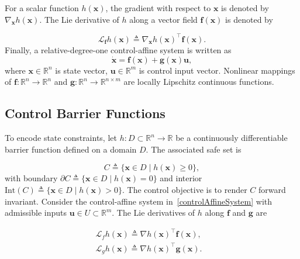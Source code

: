 \documentclass[journal]{IEEEtran}
\begin{document}
For a scalar function $h(\bm{x})$, the gradient with respect to $\bm{x}$ is denoted by $\nabla_{\bm{x}}h(\bm{x})$. The Lie derivative of $h$ along a vector field $\bm{f}(\bm{x})$ is denoted by

\begin{equation}
    \mathcal{L}_{\bm{f}}h(\bm{x})
    \triangleq
    \nabla_{\bm{x}}h(\bm{x})^{\top}\bm{f}(\bm{x}).
\end{equation}
Finally, a relative-degree-one control-affine system is written as
\begin{equation}
\label{controlAffineSystem}
    \dot{\bm{x}} = \bm{f}(\bm{x}) + \bm{g}(\bm{x})\bm{u},
\end{equation}
where $\bm{x} \in \mathbb{R}^n$ is state vector, $\bm{u} \in \mathbb{R}^m$ is control input vector. Nonlinear mappings of $\bm{f} : \mathbb{R}^n \to \mathbb{R}^n$ and $\bm{g} : \mathbb{R}^n \to \mathbb{R}^{n \times m}$ are locally Lipschitz continuous functions.

\subsection{Control Barrier Functions}
\label{controlBarrierFunctions}

To encode state constraints, let $h : D\subset\mathbb{R}^n \to \mathbb{R}$ be a continuously differentiable barrier function defined on a domain $D$. The associated safe set is

\begin{equation}
    C \triangleq \{\bm{x}\in D \mid h(\bm{x}) \ge 0\},
\end{equation}
with boundary $\partial C \triangleq \{\bm{x}\in D \mid h(\bm{x})=0\}$ and interior $\mathrm{Int}(C)\triangleq \{\bm{x}\in D \mid h(\bm{x})>0\}$. The control objective is to render $C$ forward invariant. Consider the control-affine system in~\eqref{controlAffineSystem} with admissible inputs $\bm{u}\in U\subset\mathbb{R}^m$. The Lie derivatives of $h$ along $\bm f$ and $\bm g$ are

\begin{equation}
\begin{split}
    \mathcal{L}_f h(\bm{x}) \triangleq \nabla h(\bm{x})^\top \bm{f}(\bm{x}),& \\
    \mathcal{L}_g h(\bm{x}) \triangleq \nabla h(\bm{x})^\top \bm{g}(\bm{x}).&
\end{split}
\end{equation}
\end{document}
